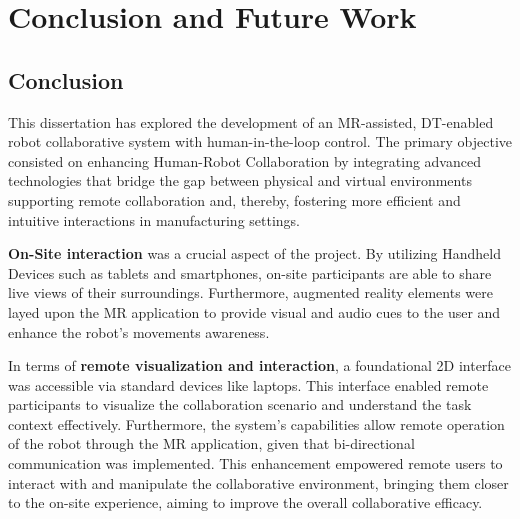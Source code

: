\chapter{Conclusion and Future Work}%



\section{Conclusion}

This dissertation has explored the development of an \ac{MR}-assisted, \ac{DT}-enabled robot collaborative system with human-in-the-loop control. The primary objective consisted on enhancing Human-Robot Collaboration by integrating advanced technologies that bridge the gap between physical and virtual environments supporting remote collaboration and, thereby, fostering more efficient and intuitive interactions in manufacturing settings.

\textbf{On-Site interaction} was a crucial aspect of the project. By utilizing Handheld Devices such as tablets and smartphones, on-site participants are able to share live views of their surroundings. Furthermore, augmented reality elements were layed upon the \ac{MR} application to provide visual and audio cues to the user and enhance the robot's movements awareness. 

In terms of \textbf{remote visualization and interaction}, a foundational 2D interface was accessible via standard devices like laptops. This interface enabled remote participants to visualize the collaboration scenario and understand the task context effectively. Furthermore, the system's capabilities allow remote operation of the robot through the \ac{MR} application, given that bi-directional communication was implemented. This enhancement empowered remote users to interact with and manipulate the collaborative environment, bringing them closer to the on-site experience, aiming to improve the overall collaborative efficacy.



